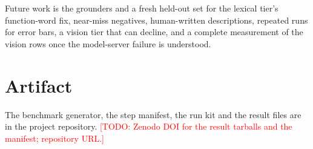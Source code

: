 \documentclass[conference]{IEEEtran}
\newcommand{\todo}[1]{\textcolor{red}{[TODO: #1]}}
\begin{document}
Future work is the grounders and a fresh held-out set for the lexical tier's function-word fix, near-miss negatives, human-written descriptions, repeated runs for error bars, a vision tier that can decline, and a complete measurement of the vision rows once the model-server failure is understood.

\section*{Artifact}
The benchmark generator, the step manifest, the run kit and the result files are in the project repository. \todo{Zenodo DOI for the result tarballs and the manifest; repository URL.}



\end{document}
